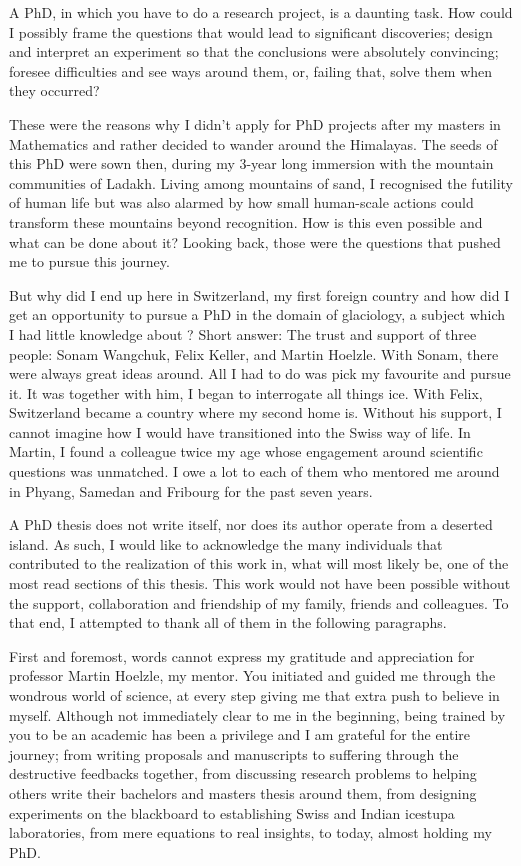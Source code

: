 %
\label{sec:acknowledgement}

A PhD, in which you have to do a research project, is a daunting task. How could I possibly frame the questions
that would lead to significant discoveries; design and interpret an experiment so that the conclusions were
absolutely convincing; foresee difficulties and see ways around them, or, failing that, solve them when they
occurred?

These were the reasons why I didn't apply for PhD projects after my masters in Mathematics and rather decided
to wander around the Himalayas. The seeds of this PhD were sown then, during my 3-year long immersion with the
mountain communities of Ladakh. Living among mountains of sand, I recognised the futility of human life but was
also alarmed by how small human-scale actions could transform these mountains beyond recognition. How is this
even possible and what can be done about it? Looking back, those were the questions that pushed me to pursue
this journey. 

But why did I end up here in Switzerland, my first foreign country and how did I get an opportunity to pursue a
PhD in the domain of glaciology, a subject which I had little knowledge about ? Short answer: The trust and support
of three people: Sonam Wangchuk, Felix Keller, and Martin Hoelzle. With Sonam, there were always great ideas
around. All I had to do was pick my favourite and pursue it. It was together with him, I began to interrogate
all things ice.  With Felix, Switzerland became a country where my second home is. Without his support, I cannot
imagine how I would have transitioned into the Swiss way of life. In Martin, I found a colleague twice my age
whose engagement around scientific questions was unmatched. I owe a lot to each of them who mentored me around
in Phyang, Samedan and Fribourg for the past seven years.

A PhD thesis does not write itself, nor does its author operate from a deserted island. As such, I would like to
acknowledge the many individuals that contributed to the realization of this work in, what will most likely be,
one of the most read sections of this thesis. This work would not have been possible without the support,
collaboration and friendship of my family, friends and colleagues. To that end, I attempted to thank all of them
in the following paragraphs.

First and foremost, words cannot express my gratitude and appreciation for professor Martin Hoelzle, my mentor.
You initiated and guided me through the wondrous world of science, at every step giving me that extra push to
believe in myself. Although not immediately clear to me in the beginning, being trained by you to be an academic
has been a privilege and I am grateful for the entire journey; from writing proposals and manuscripts to
suffering through the destructive feedbacks together, from discussing research problems to helping others write
their bachelors and masters thesis around them, from designing experiments on the blackboard to establishing
Swiss and Indian icestupa laboratories, from mere equations to real insights, to today, almost holding my PhD.

